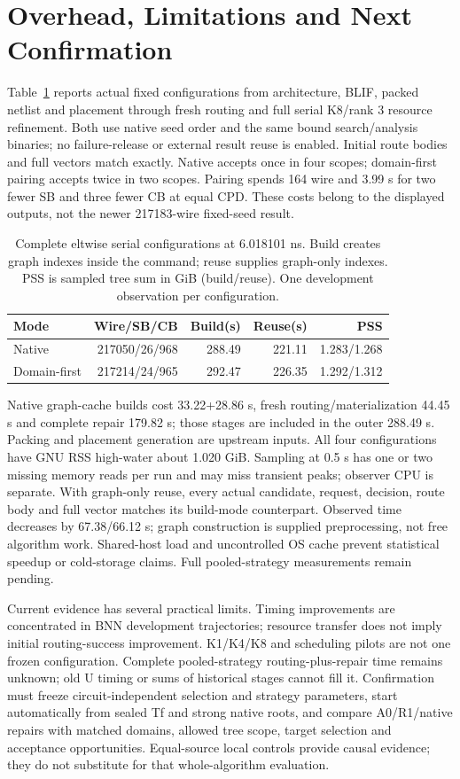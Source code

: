 \documentclass[conference,10pt]{IEEEtran}
\begin{document}
\section{Overhead, Limitations and Next Confirmation}
Table~\ref{tab:completecost} reports actual fixed configurations from architecture, BLIF, packed netlist and placement through fresh routing and full serial K8/rank 3 resource refinement. Both use native seed order and the same bound search/analysis binaries; no failure-release or external result reuse is enabled. Initial route bodies and full vectors match exactly. Native accepts once in four scopes; domain-first pairing accepts twice in two scopes. Pairing spends 164 wire and 3.99 s for two fewer SB and three fewer CB at equal CPD. These costs belong to the displayed outputs, not the newer 217183-wire fixed-seed result.
\begin{table}[t]
\centering\footnotesize\setlength{\tabcolsep}{3pt}
\caption{Complete eltwise serial configurations at 6.018101 ns. Build creates graph indexes inside the command; reuse supplies graph-only indexes. PSS is sampled tree sum in GiB (build/reuse). One development observation per configuration.}
\label{tab:completecost}
\begin{tabular}{lrrrr}\hline
Mode & Wire/SB/CB & Build(s) & Reuse(s) & PSS\\\hline
Native &217050/26/968&288.49&221.11&1.283/1.268\\
Domain-first &217214/24/965&292.47&226.35&1.292/1.312\\\hline
\end{tabular}
\end{table}

Native graph-cache builds cost 33.22+28.86 s, fresh routing/materialization 44.45 s and complete repair 179.82 s; those stages are included in the outer 288.49 s. Packing and placement generation are upstream inputs. All four configurations have GNU RSS high-water about 1.020 GiB. Sampling at 0.5 s has one or two missing memory reads per run and may miss transient peaks; observer CPU is separate. With graph-only reuse, every actual candidate, request, decision, route body and full vector matches its build-mode counterpart. Observed time decreases by 67.38/66.12 s; graph construction is supplied preprocessing, not free algorithm work. Shared-host load and uncontrolled OS cache prevent statistical speedup or cold-storage claims. Full pooled-strategy measurements remain pending.

Current evidence has several practical limits. Timing improvements are concentrated in BNN development trajectories; resource transfer does not imply initial routing-success improvement. K1/K4/K8 and scheduling pilots are not one frozen configuration. Complete pooled-strategy routing-plus-repair time remains unknown; old U timing or sums of historical stages cannot fill it. Confirmation must freeze circuit-independent selection and strategy parameters, start automatically from sealed Tf and strong native roots, and compare A0/R1/native repairs with matched domains, allowed tree scope, target selection and acceptance opportunities. Equal-source local controls provide causal evidence; they do not substitute for that whole-algorithm evaluation.
\end{document}

